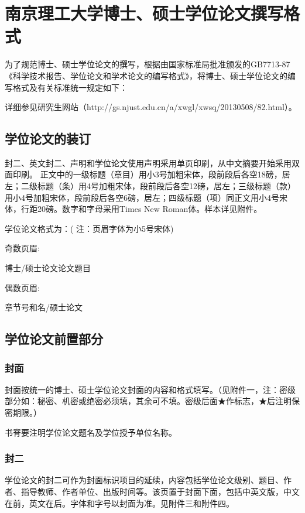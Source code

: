 \chapter{南京理工大学博士、硕士学位论文撰写格式}
\label{app:format}
为了规范博士、硕士学位论文的撰写，根据由国家标准局批准颁发的GB7713-87《科学技术报告、学位论文和学术论文的编写格式》，将博士、硕士学位论文的编写格式及有关标准统一规定如下：

详细参见研究生网站（http://gs.njust.edu.cn/a/xwgl/xwsq/20130508/82.html）。

\section{学位论文的装订}

封二、英文封二、声明和学位论文使用声明采用单页印刷，从中文摘要开始采用双面印刷。
正文中的一级标题（章目）用小3号加粗宋体，段前段后各空18磅，居左；二级标题（条）用4号加粗宋体，段前段后各空12磅，居左；三级标题（款）用小4号加粗宋体，段前段后各空6磅，居左；四级标题（项）同正文用小4号宋体，行距20磅。数字和字母采用Times New Roman体。样本详见附件。

学位论文格式为：( 注：页眉字体为小5号宋体)

奇数页眉:

博士/硕士论文\hspace{40pt}论文题目

偶数页眉:

章节号和名\hspace{40pt}/硕士论文


\section{学位论文前置部分}
\subsection{封面}
封面按统一的博士、硕士学位论文封面的内容和格式填写。（见附件一，注：密级部分如：秘密、机密或绝密必须填，其余可不填。密级后面★作标志，★后注明保密期限。）

书脊要注明学位论文题名及学位授予单位名称。

\subsection{封二}
学位论文的封二可作为封面标识项目的延续，内容包括学位论文级别、题目、作者、指导教师、作者单位、出版时间等。该页置于封面下面，包括中英文版，中文在前，英文在后。字体和字号以封面为准。见附件三和附件四。

